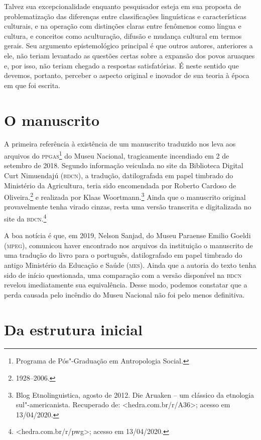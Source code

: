 Talvez sua excepcionalidade enquanto pesquisador esteja em sua proposta de problematização 
das diferenças entre classificações
linguísticas e características culturais, e na operação com distinções claras
entre fenômenos como língua e cultura, e conceitos como aculturação,
difusão e mudança cultural em termos gerais. Seu argumento
epistemológico principal é que outros autores, anteriores a ele, não
teriam levantado as questões certas sobre a expansão dos povos aruaques e, por
isso, não teriam chegado a respostas satisfatórias. É neste sentido que devemos,
portanto, perceber o aspecto original e inovador de sua teoria à época em que foi 
escrita.

\section{O manuscrito}

A primeira referência à existência de um manuscrito traduzido nos leva aos arquivos do \textsc{ppgas}\footnote{Programa de Pós"-Graduação em Antropologia Social.} do Museu Nacional, 
tragicamente incendiado em 2 de setembro de 2018. Segundo informação veiculada no site da Biblioteca Digital Curt Nimuendajú (\textsc{bdcn}), a tradução, datilografada em papel timbrado do Ministério da Agricultura, teria sido encomendada por Roberto Cardoso de Oliveira.\footnote{1928--2006.} e realizada por Klaas Woortmann.\footnote{Blog Etnolinguistica, agosto de 2012. Die Aruaken -- um clássico da etnologia sul"-americanista. Recuperado de: \textless{}hedra.com.br/r/A36\textgreater{}; acesso em 13/04/2020.} Ainda que o manuscrito original provavelmente tenha virado cinzas, resta uma versão transcrita e digitalizada no site da \textsc{bdcn}.\footnote{\textless{}hedra.com.br/r/pwg\textgreater{}; acesso em 13/04/2020.} 

A boa notícia é que, em 2019, Nelson Sanjad, do Museu Paraense Emilio Goeldi (\textsc{mpeg}), comunicou haver encontrado nos arquivos da instituição o manuscrito de uma tradução do livro para o português, datilografado em papel timbrado do antigo Ministério da Educação e Saúde (\textsc{mes}). Ainda que a autoria do texto tenha sido de início questionada, uma comparação com a versão disponível na \textsc{bdcn} revelou imediatamente sua equivalência. Desse modo, podemos constatar que a perda causada pelo incêndio do Museu Nacional não foi pelo menos definitiva.

\section{Da estrutura inicial}

